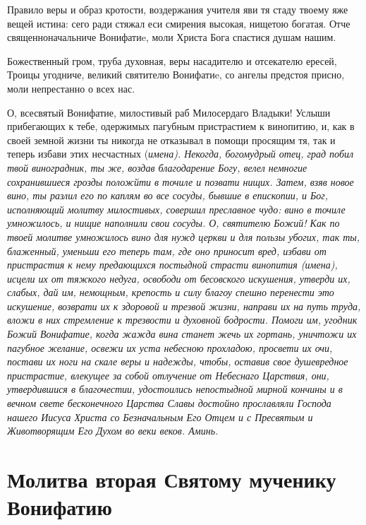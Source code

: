 Правило веры и образ кротости, воздержания учителя яви тя стаду твоему яже вещей истина: сего ради стяжал еси смирения высокая, нищетою богатая. Отче священноначальниче Вонифатиe, моли Христа Бога спастися душам нашим.




Божественный гром, труба духовная, веры насадителю и отсекателю ересей, Троицы угодниче, великий святителю Вонифатиe, со ангелы предстоя присно,  моли непрестанно о всех нас.




О, всесвятый Вонифатие, милостивый раб Милосердаго Владыки! Услыши прибегающих к тебе, одержимых пагубным пристрастием к винопитию, и, как в своей земной жизни ты никогда не отказывал в помощи просящим тя, так и теперь избави этих несчастных (\itshape имена\normalfont{}). Некогда, богомудрый отец, град побил твой виноградник, ты же, воздав благодарение Богу, велел немногие сохранившиеся грозды положйти в точиле и позвати нищих. Затем, взяв новое вино, ты разлил его по каплям во все сосуды, бывшие в епископии, и Бог, исполняющий молитву милостивых, совершил преславное чудо: вино в точиле умножилось, и нищие наполнили свои сосуды. О, святителю Божий! Как по твоей молитве умножилось вино для нужд церкви и для пользы убогих, так ты, блаженный, уменьши его теперь там, где оно приносит вред, избави от пристрастия к нему предающихся постыдной страсти винопития (\itshape имена\normalfont{}), исцели их от тяжкого недуга, освободи от бесовского искушения, утверди их, слабых, дай им, немощным, крепость и силу благоу спешно перенести это искушение, возврати их к здоровой и трезвой жизни, направи их на путь труда, вложи в них стремление к трезвости и духовной бодрости. Помоги им, угодник Божий Вонифатие, когда жажда вина станет жечь их гортань, уничтожи их пагубное желание, освежи их уста небесною прохладою, просвети их очи, постави их ноги на скале веры и надежды, чтобы, оставив свое душевредное пристрастие, влекущее за собой отлучение от Небеснаго Царствия, они, утвердившися в благочестии, удостоились непостыдной мирной кончины и в вечном свете бесконечного Царства Славы достойно прославляли Господа нашего Иисуса Христа со Безначальным Его Отцем и с Пресвятым и Животворящим Его Духом во веки веков. Аминь.


\section{Молитва вторая Святому мученику Вонифатию}
 


